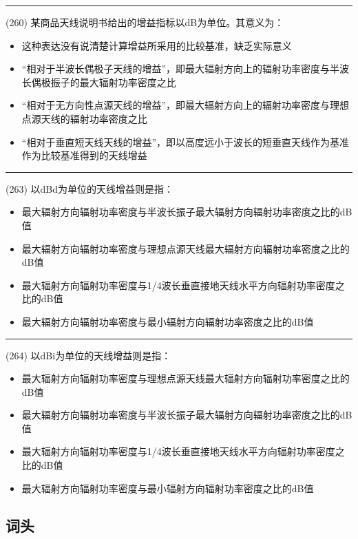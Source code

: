 \documentclass[twocolumn,hyperref,UTF8]{ctexart}  %
\begin{document}
\noindent\rule{0.5\textwidth}{1pt}
\heiti (260) 某商品天线说明书给出的增益指标以dB为单位。其意义为： \songti {\color{gray} [LK0931] }
\begin{itemize}
	\item  这种表达{\color{LimeGreen}没有说清楚}计算增益所采用的比较基准，缺乏实际意义
	\item  “相对于半波长偶极子天线的增益”，即最大辐射方向上的辐射功率密度与半波长偶极振子的最大辐射功率密度之比
	\item  “相对于无方向性点源天线的增益”，即最大辐射方向上的辐射功率密度与理想点源天线的辐射功率密度之比
	\item  “相对于垂直短天线天线的增益”，即以高度远小于波长的短垂直天线作为基准作为比较基准得到的天线增益
\end{itemize}


\noindent\rule{0.5\textwidth}{1pt}
\heiti (263) 以dBd为单位的天线增益则是指： \songti {\color{gray} [LK1062] }
\begin{itemize}
	\item  最大辐射方向辐射功率密度与{\color{LimeGreen}半波长振子}最大辐射方向辐射功率密度之比的dB值
	\item  最大辐射方向辐射功率密度与理想点源天线最大辐射方向辐射功率密度之比的dB值
	\item  最大辐射方向辐射功率密度与1/4波长垂直接地天线水平方向辐射功率密度之比的dB值
	\item  最大辐射方向辐射功率密度与最小辐射方向辐射功率密度之比的dB值
\end{itemize}


\noindent\rule{0.5\textwidth}{1pt}
\heiti (264) 以dBi为单位的天线增益则是指： \songti {\color{gray} [LK1063] }
\begin{itemize}
	\item  最大辐射方向辐射功率密度与{\color{LimeGreen}理想点源天线}最大辐射方向辐射功率密度之比的dB值
	\item  最大辐射方向辐射功率密度与半波长振子最大辐射方向辐射功率密度之比的dB值
	\item  最大辐射方向辐射功率密度与1/4波长垂直接地天线水平方向辐射功率密度之比的dB值
	\item  最大辐射方向辐射功率密度与最小辐射方向辐射功率密度之比的dB值
\end{itemize}


\clearpage
\subsection{词头}
\end{document}
